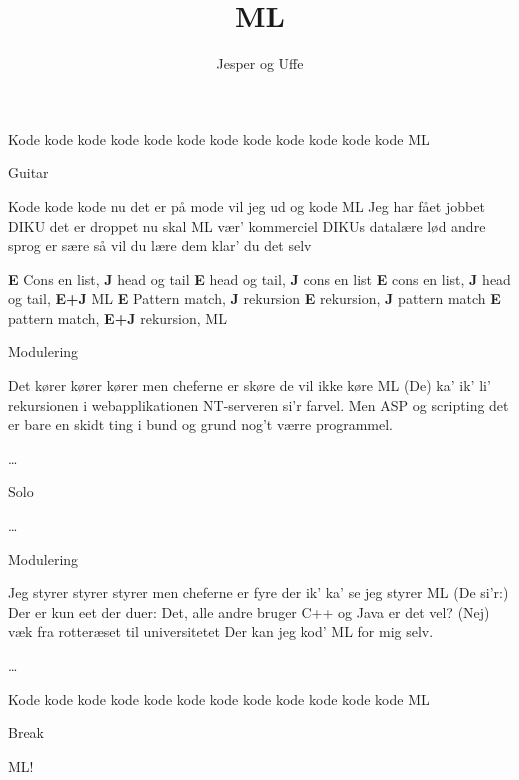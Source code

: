 \documentclass[danish]{article}
\title{ML}
\author{Jesper og Uffe}
\begin{document}
\begin{song}

 Kode kode kode
kode kode kode
kode kode kode
kode kode kode ML

\scene Guitar

 Kode kode kode
nu det er på mode
vil jeg ud og kode ML
Jeg har fået jobbet
DIKU det er droppet
nu skal ML vær' kommerciel
DIKUs datalære
lød andre sprog er sære
så vil du lære dem klar' du det selv

 \textbf{E} Cons en list, \textbf{J} head og tail
\textbf{E} head og tail, \textbf{J} cons en list
\textbf{E} cons en list, \textbf{J} head og tail, \textbf{E+J} ML
\textbf{E} Pattern match, \textbf{J} rekursion
\textbf{E} rekursion, \textbf{J} pattern match
\textbf{E} pattern match, \textbf{E+J} rekursion, ML

\scene Modulering

 Det kører kører kører
men cheferne er skøre
de vil ikke køre ML
(De) ka' ik' li' rekursionen
i webapplikationen
NT-serveren si'r farvel.
Men ASP og scripting
det er bare en skidt ting
i bund og grund nog't værre programmel.

 \ldots

\scene Solo

 \ldots

\scene Modulering

 Jeg styrer styrer styrer
men cheferne er fyre
der ik' ka' se jeg styrer ML
(De si'r:) Der er kun eet der duer:
Det, alle andre bruger
C++ og Java er det vel?
(Nej) væk fra rotteræset
til universitetet  
Der kan jeg kod' ML for mig selv.

 \ldots

 Kode kode kode
kode kode kode
kode kode kode
kode kode kode ML

\scene Break

 ML!

\end{song}
\end{document}
